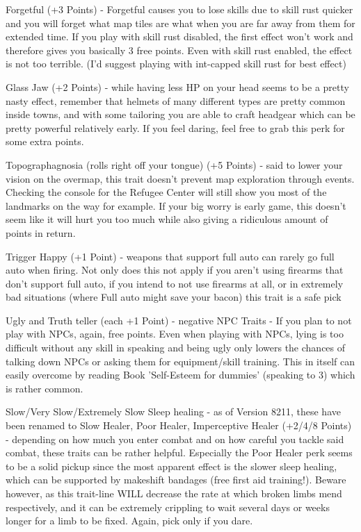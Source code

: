 \documentclass[11pt]{report}
\begin{document}
Forgetful (+3 Points) - Forgetful causes you to lose skills due to skill rust quicker and you will forget what map tiles are what when you are far away from them for extended time. If you play with skill rust disabled, the first effect won't work and therefore gives you basically 3 free points. Even with skill rust enabled, the effect is not too terrible. (I'd suggest playing with int-capped skill rust for best effect)

Glass Jaw (+2 Points) - while having less HP on your head seems to be a pretty nasty effect, remember that helmets of many different types are pretty common inside towns, and with some tailoring you are able to craft headgear which can be pretty powerful relatively early. If you feel daring, feel free to grab this perk for some extra points.

Topographagnosia (rolls right off your tongue) (+5 Points) - said to lower your vision on the overmap, this trait doesn't prevent map exploration through events. Checking the console for the Refugee Center will still show you most of the landmarks on the way for example. If your big worry is early game, this doesn't seem like it will hurt you too much while also giving a ridiculous amount of points in return.

Trigger Happy (+1 Point) - weapons that support full auto can rarely go full auto when firing. Not only does this not apply if you aren't using firearms that don't support full auto, if you intend to not use firearms at all, or in extremely bad situations (where Full auto might save your bacon) this trait is a safe pick

Ugly and Truth teller (each +1 Point) - negative NPC Traits - If you plan to not play with NPCs, again, free points. Even when playing with NPCs, lying is too difficult without any skill in speaking and being ugly only lowers the chances of talking down NPCs or asking them for equipment/skill training. This in itself can easily overcome by reading Book 'Self-Esteem for dummies' (speaking to 3) which is rather common.

Slow/Very Slow/Extremely Slow Sleep healing - as of Version 8211, these have been renamed to Slow Healer, Poor Healer, Imperceptive Healer (+2/4/8 Points) - depending on how much you enter combat and on how careful you tackle said combat, these traits can be rather helpful. Especially the Poor Healer perk seems to be a solid pickup since the most apparent effect is the slower sleep healing, which can be supported by makeshift bandages (free first aid training!). Beware however, as this trait-line WILL decrease the rate at which broken limbs mend respectively, and it can be extremely crippling to wait several days or weeks longer for a limb to be fixed. Again, pick only if you dare.
\end{document}
